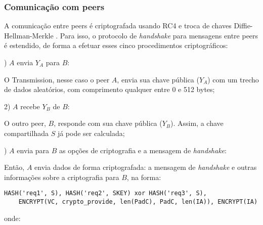 
\subsubsection*{Comunicação com peers}

A comunicação entre \glspl*{peer} é criptografada usando RC4 e troca de chaves
Diffie-Hellman-Merkle \cite{wikivuze:encription}. Para isso, o protocolo de
\emph{handshake} para mensagens entre \glspl*{peer} é estendido, de forma a efetuar
esses cinco procedimentos criptográficos:


) $A$ envia $Y_A$ para $B$:

O Transmission, nesse caso o \gls*{peer} $A$, envia sua chave pública ($Y_A$) com um
trecho de dados aleatórios, com comprimento qualquer entre 0 e 512 bytes;


2) $A$ recebe $Y_B$ de $B$:

O outro \gls*{peer}, $B$, responde com sua chave pública ($Y_B$). Assim, a chave
compartilhada $S$ já pode ser calculada;


) $A$ envia para $B$ as opções de criptografia e a mensagem de \emph{handshake}:

Então, $A$ envia dados de forma criptografada: a mensagem de \emph{handshake} e outras
informações sobre a criptografia para $B$, na forma:

\begin{verbatim}
HASH('req1', S), HASH('req2', SKEY) xor HASH('req3', S),
    ENCRYPT(VC, crypto_provide, len(PadC), PadC, len(IA)), ENCRYPT(IA)
\end{verbatim}

onde:

